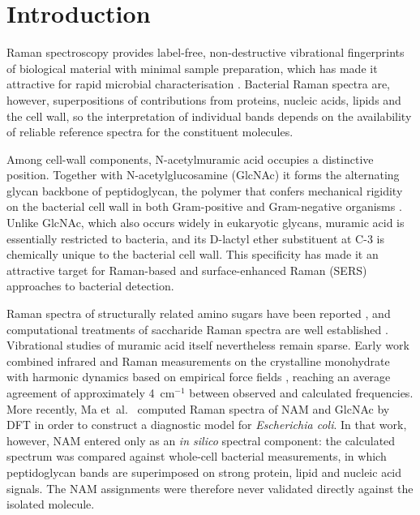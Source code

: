 \documentclass[preprint,12pt]{elsarticle}
\newcommand{\wn}{\ensuremath{\mathrm{cm}^{-1}}}
\begin{document}
\section{Introduction}

Raman spectroscopy provides label-free, non-destructive vibrational fingerprints
of biological material with minimal sample preparation, which has made it
attractive for rapid microbial characterisation \cite{wang2022bacteria,
ma2024ecoli}. Bacterial Raman spectra are, however, superpositions of
contributions from proteins, nucleic acids, lipids and the cell wall, so the
interpretation of individual bands depends on the availability of reliable
reference spectra for the constituent molecules.

Among cell-wall components, N-acetylmuramic acid occupies a distinctive
position. Together with N-acetylglucosamine (GlcNAc) it forms the alternating
glycan backbone of peptidoglycan, the polymer that confers mechanical rigidity
on the bacterial cell wall in both Gram-positive and Gram-negative organisms
\cite{vollmer2008}. Unlike GlcNAc, which also occurs widely in eukaryotic
glycans, muramic acid is essentially restricted to bacteria, and its D-lactyl
ether substituent at C-3 is chemically unique to the bacterial cell wall. This
specificity has made it an attractive target for Raman-based and
surface-enhanced Raman (SERS) approaches to bacterial detection.

Raman spectra of structurally related amino sugars have been reported
\cite{she1974raman}, and computational treatments of saccharide Raman spectra
are well established \cite{kaminsky2020saccharides}. Vibrational studies of
muramic acid itself nevertheless remain sparse. Early work combined infrared and
Raman measurements on the crystalline monohydrate with harmonic dynamics based on
empirical force fields \cite{kouach1994}, reaching an average agreement of
approximately 4~\wn{} between observed and calculated frequencies. More
recently, Ma et~al.\ \cite{ma2024ecoli} computed Raman spectra of NAM and GlcNAc
by DFT in order to construct a diagnostic model for \emph{Escherichia coli}. In
that work, however, NAM entered only as an \emph{in silico} spectral component:
the calculated spectrum was compared against whole-cell bacterial measurements,
in which peptidoglycan bands are superimposed on strong protein, lipid and
nucleic acid signals. The NAM assignments were therefore never validated
directly against the isolated molecule.
\end{document}
